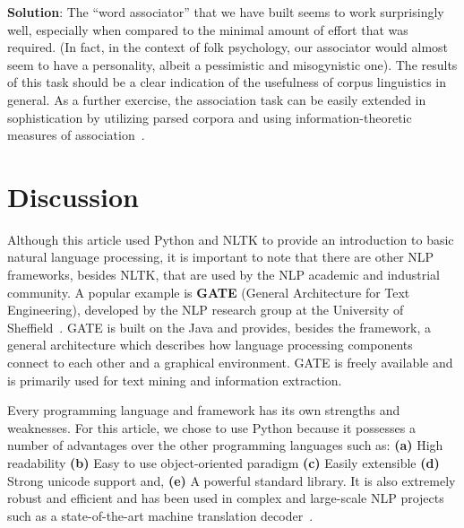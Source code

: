 \documentclass[11pt]{article}
\begin{document}
\noindent \textbf{Solution}: The ``word associator'' that we have built seems to work surprisingly well, especially when compared to the minimal amount of effort that was required. (In fact, in the context of folk psychology, our associator would almost seem to have a personality, albeit a pessimistic and misogynistic one). The results of this task should be a clear indication of the usefulness of corpus linguistics in general. As a further exercise, the association task can be easily extended in sophistication by utilizing parsed corpora and using information-theoretic measures of association~\cite{wordnorms}.


\section{Discussion} %
\label{sec:discussion}
Although this article used Python and NLTK to provide an introduction to basic natural language processing, it is important to note that there are other NLP frameworks, besides NLTK, that are used by the NLP academic and industrial community. A popular example is \textbf{GATE} (General Architecture for Text Engineering), developed by the NLP research group at the University of Sheffield~\cite{gate}. GATE is built on the Java and provides, besides the framework, a general architecture which describes how language processing components connect to each other and a graphical environment. GATE is freely available and is primarily used for text mining and information extraction.

Every programming language and framework has its own strengths and weaknesses. For this article, we chose to use Python because it possesses a number of advantages over the other programming languages such as: \textbf{(a)} High readability \textbf{(b)} Easy to use object-oriented paradigm \textbf{(c)} Easily extensible \textbf{(d)} Strong unicode support and, \textbf{(e)} A powerful standard library. It is also extremely robust and efficient and has been used in complex and large-scale NLP projects such as a state-of-the-art machine translation decoder~\cite{hiero}.
\end{document}
